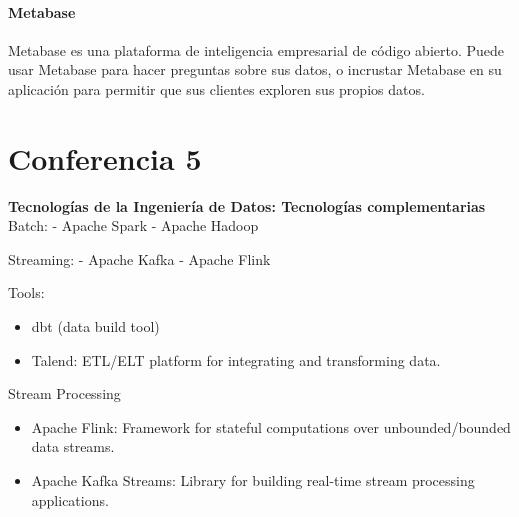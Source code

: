 \documentclass[12pt]{book}
\begin{document}
\subsubsection{Metabase}
Metabase es una plataforma de inteligencia empresarial de código abierto. Puede usar Metabase para hacer preguntas sobre sus datos, o incrustar Metabase en su aplicación para permitir que sus clientes exploren sus propios datos.

\chapter{Conferencia 5}
\normalfont\LARGE \textbf{Tecnologías de la Ingeniería de Datos: Tecnologías complementarias}
\normalfont\small\\

Batch:
- Apache Spark
- Apache Hadoop

Streaming:
- Apache Kafka
- Apache Flink

Tools:
\begin{itemize}
    \item dbt (data build tool)
    \item Talend: ETL/ELT platform for integrating and transforming data.
\end{itemize}

Stream Processing
\begin{itemize}
    \item Apache Flink: Framework for stateful computations over unbounded/bounded data streams.
    \item Apache Kafka Streams: Library for building real-time stream processing applications.
\end{itemize}
\end{document}
